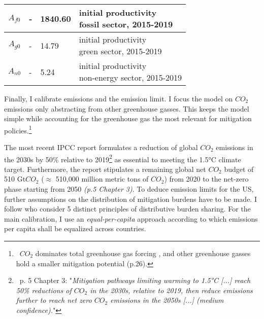 \begin{table}[h!]
\begin{center}
\begin{tabular}{c|lll}
 			\hline
 			$A_{f0}$&- &1840.60& \makecell[l]{initial productivity \\ fossil sector, 2015-2019}  \\
 			\hline
 			$A_{g0}$&- &14.79& \makecell[l]{initial productivity \\ green sector, 2015-2019}  \\
 			\hline
 			$A_{n0}$&- &5.24& \makecell[l]{initial productivity \\ non-energy sector, 2015-2019}  \\
 			\hline \hline
 		\end{tabular}
 	\end{center}
 \end{table}
 \clearpage
 
 
 Finally, I calibrate emissions and the emission limit.  I focus the model on $CO_2$ emissions only abstracting from other greenhouse gasses. This keeps the model simple while accounting for the greenhouse gas the most relevant for mitigation policies.\footnote{\ $CO_2$ dominates total greenhouse gas forcing \citep[p.29]{IPCC2022}, and other greenhouse gasses hold a smaller mitigation potential (p.26).}
 
 The most recent IPCC report \citep{IPCC2022} formulates a reduction of global $CO_2$ emissions in the 2030s by 50\% relative to 2019\footnote{\ p. 5 Chapter 3: "\textit{Mitigation pathways limiting warming to 1.5°C [...] reach 50\% reductions of $CO_2$ in the 2030s, relative to 2019, then reduce emissions further to reach net zero $CO_2$ emissions in the 2050s [...] (\textnormal{medium confidence}).}"}  as essential to meeting the 1.5°C climate target.  Furthermore, the report stipulates a remaining global net $CO_2$ budget of 510 Gt$CO_2$ ($\approx$ 510,000 million metric tons of $CO_2$) from 2020 to the net-zero phase starting from 2050 \textit{(p.5 Chapter 3)}. 
To deduce emission limits for the US, further assumptions on the distribution of mitigation burdens have to be made. I follow \cite{RobiouDuPont2017EquitableGoals} who consider 5 distinct principles of distributive burden sharing. For the main calibration, I use an \textit{equal-per-capita} approach according to which emissions per capita shall be equalized across countries. 
 
